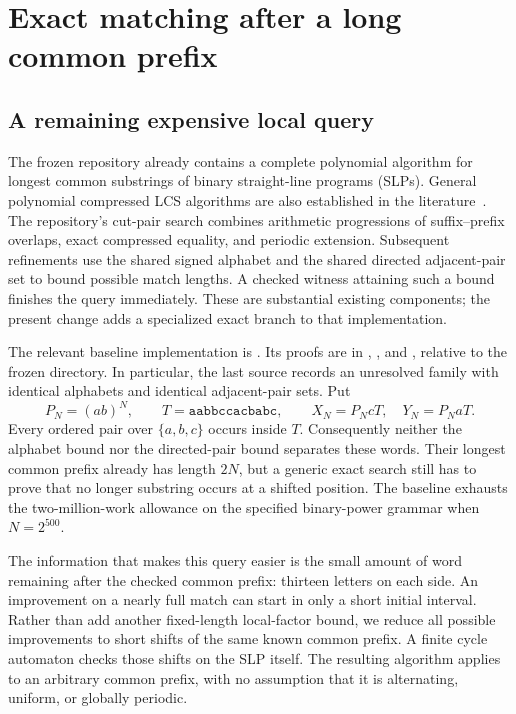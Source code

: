 \section{Exact matching after a long common prefix}
\label{sec:matching}

\subsection{A remaining expensive local query}

The frozen repository already contains a complete polynomial algorithm for
longest common substrings of binary straight-line programs (SLPs). General
polynomial compressed LCS algorithms are also established in the
literature~\cite{compressed-lcs-classical}. The repository's
cut-pair search combines arithmetic progressions of suffix--prefix overlaps,
exact compressed equality, and periodic extension. Subsequent refinements
use the shared signed alphabet and the shared directed adjacent-pair set
to bound possible match lengths. A checked witness attaining such a bound
finishes the query immediately. These are substantial existing components;
the present change adds a specialized exact branch to that implementation.

The relevant baseline implementation is
. Its proofs are in
, ,
and , relative to the frozen
 directory. In particular, the last source
records an unresolved family with identical alphabets and identical
adjacent-pair sets. Put
\[
 P_N=(ab)^N,\qquad T=\mathtt{aabbccacbabc},\qquad
 X_N=P_NcT,\quad Y_N=P_NaT.
\]
Every ordered pair over $\{a,b,c\}$ occurs inside $T$. Consequently neither
the alphabet bound nor the directed-pair bound separates these words.
Their longest common prefix already has length $2N$, but a generic exact
search still has to prove that no longer substring occurs at a shifted
position. The baseline exhausts the two-million-work allowance on the
specified binary-power grammar when $N=2^{500}$.

The information that makes this query easier is the small amount of word
remaining after the checked common prefix: thirteen letters on each side.
An improvement on a nearly full match can start in only a short initial
interval. Rather than add another fixed-length local-factor bound, we
reduce all possible improvements to short shifts of the same known common
prefix. A finite cycle automaton checks those shifts on the SLP itself.
The resulting algorithm applies to an arbitrary common prefix, with no
assumption that it is alternating, uniform, or globally periodic.

